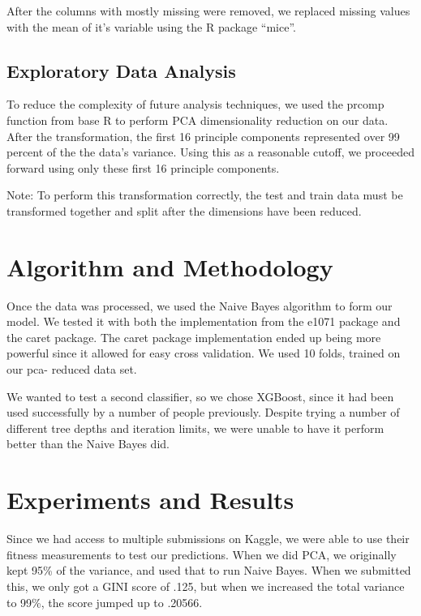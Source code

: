 \documentclass[fleqn,10pt]{SelfArx} %
\begin{document}
After the columns with mostly missing were removed, we replaced missing values with the mean of it's variable using the R package ``mice''.
\subsection{Exploratory Data Analysis}

To reduce the complexity of future analysis techniques, we used the prcomp function from base R to perform PCA dimensionality reduction on our data. After the transformation, the first 16 principle components represented over 99 percent of the the data's variance. Using this as a reasonable cutoff, we proceeded forward using only these first 16 principle components.

Note: To perform this transformation correctly, the test and train data must be transformed together and split after the dimensions have been reduced.
\bigskip
\bigskip


\section{Algorithm and Methodology}

Once the data was processed, we used the Naive Bayes algorithm to form our model. We tested it with both the implementation from the e1071 package and the caret package. The caret package implementation ended up being more powerful since it allowed for easy cross validation. We used 10 folds, trained on our pca- reduced data set. 

We wanted to test a second classifier, so we chose XGBoost, since it had been used successfully by a number of people previously. Despite trying a number of different tree depths and iteration limits, we were unable to have it perform better than the Naive Bayes did. 


\bigskip
\bigskip
\section{Experiments and Results}
Since we had access to multiple submissions on Kaggle, we were able to use their fitness measurements to test our predictions. When we did PCA, we originally kept 95\% of the variance, and used that to run Naive Bayes. When we submitted this, we only got a GINI score of .125, but when we increased the total variance to 99\%, the score jumped up to .20566.  
\end{document}
